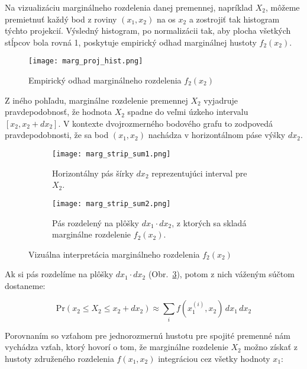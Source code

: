 Na vizualizáciu marginálneho rozdelenia danej premennej, napríklad $X_2$, môžeme premietnuť každý bod z roviny $(x_1, x_2)$ na os $x_2$ a zostrojiť tak histogram týchto projekcií. Výsledný histogram, po normalizácii tak, aby plocha všetkých stĺpcov bola rovná 1, poskytuje empirický odhad marginálnej hustoty $f_2(x_2)$.

\begin{figure}[H] 
    \centering 
    \texttt{[image: marg\_proj\_hist.png]} 
    \caption{Empirický odhad marginálneho rozdelenia $f_2(x_2)$} 
    \label{fig:margin_proj} 
\end{figure}

Z iného pohľadu, marginálne rozdelenie premennej $X_2$ vyjadruje pravdepodobnosť, že hodnota $X_2$ spadne do veľmi úzkeho intervalu $[x_2, x_2 + dx_2]$. V kontexte dvojrozmerného bodového grafu to zodpovedá pravdepodobnosti, že sa bod $(x_1, x_2)$ nachádza v horizontálnom páse výšky $dx_2$.

\begin{figure}[H]
    \centering
    \begin{subfigure}[b]{0.48\linewidth}
        \centering
        \texttt{[image: marg\_strip\_sum1.png]}
        \caption{Horizontálny pás šírky $dx_2$ reprezentujúci interval pre $X_2$.}
        \label{fig:marg_strip_a}
    \end{subfigure}
    \hfill
    \begin{subfigure}[b]{0.48\linewidth}
        \centering
        \texttt{[image: marg\_strip\_sum2.png]}
        \caption{Pás rozdelený na plôšky $dx_1 \cdot dx_2$, z ktorých sa skladá marginálne rozdelenie $f_2(x_2)$.}
        \label{fig:marg_strip_b}
    \end{subfigure}
    \caption{Vizuálna interpretácia marginálneho rozdelenia $f_2(x_2)$}
    \label{fig:marg_strip}
\end{figure}

Ak si pás rozdelíme na plôšky $dx_1 \cdot dx_2$  (Obr.~\ref{fig:marg_strip_b}), potom z nich váženým súčtom dostaneme:

\begin{equation}
\mathrm{Pr}(x_2 \leq X_2 \leq x_2 + dx_2) \approx \sum_i f(x_1^{(i)}, x_2) \, dx_1 \, dx_2
\end{equation}

Porovnaním so vzťahom pre jednorozmernú hustotu pre spojité premenné nám vychádza vzťah, ktorý hovorí o tom, že marginálne rozdelenie $X_2$ možno získať z hustoty združeného rozdelenia $f(x_1, x_2)$ integráciou cez všetky hodnoty $x_1$:

